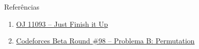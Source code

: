\begin{frame}[fragile]{Referências}

    \begin{enumerate}
        \item \href{https://onlinejudge.org/index.php?option=com_onlinejudge&Itemid=8&category=24&page=show_problem&problem=2034}{OJ 11093 -- Just Finish it Up}

        \item \href{https://codeforces.com/problemset/problem/137/B}{Codeforces Beta Round \#98 -- Problema B: Permutation}
    \end{enumerate}

\end{frame}
